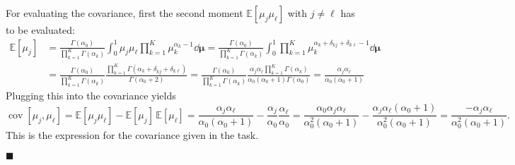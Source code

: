 \documentclass[11pt, a4paper]{scrartcl}
\newcommand{\E}{\mathbb{E}}
\DeclareMathOperator{\cov}{cov}
\renewcommand{\vec}[1]{\bm{#1}}
\newcommand{\eot}{\hfill\(\blacksquare\)}
\begin{document}
			For evaluating the covariance, first the second moment \( \E[\mu_j \mu_\ell] \) with \( j \neq \ell \) has to be evaluated:
			\begin{align}
				\E[\mu_j]
					&= \frac{\Gamma(\alpha_0)}{\prod_{k = 1}^{K} \Gamma(\alpha_k)} \int_{0}^{1}\! \mu_j \mu_\ell \prod_{k = 1}^{K} \mu_k^{\alpha_k - 1} \dd{\vec{\mu}}
					 = \frac{\Gamma(\alpha_0)}{\prod_{k = 1}^{K} \Gamma(\alpha_k)} \int_{0}^{1}\! \prod_{k = 1}^{K} \mu_k^{\alpha_k + \delta_{kj} + \delta_{k\ell} - 1} \dd{\vec{\mu}} \\
					&= \frac{\Gamma(\alpha_0)}{\prod_{k = 1}^{K} \Gamma(\alpha_k)} \frac{\prod_{k = 1}^{K} \Gamma(\alpha_k + \delta_{kj} + \delta_{k\ell})}{\Gamma(\alpha_0 + 2)}
					 = \frac{\Gamma(\alpha_0)}{\prod_{k = 1}^{K} \Gamma(\alpha_k)} \frac{\alpha_j \alpha_\ell \prod_{k = 1}^{K} \Gamma(\alpha_k)}{\alpha_0 (\alpha_0 + 1) \Gamma(\alpha_0)}
					 = \frac{\alpha_j \alpha_\ell}{\alpha_0 (\alpha_0 + 1)}
			\end{align}
			Plugging this into the covariance yields
			\begin{equation}
				\cov[\mu_j, \mu_\ell]
					= \E[\mu_j \mu_\ell] - \E[\mu_j] \, \E[\mu_\ell]
					= \frac{\alpha_j \alpha_\ell}{\alpha_0 (\alpha_0 + 1)} - \frac{\alpha_j}{\alpha_0} \frac{\alpha_\ell}{\alpha_0}
					= \frac{\alpha_0 \alpha_j \alpha_\ell}{\alpha_0^2 (\alpha_0 + 1)} - \frac{\alpha_j \alpha_\ell (\alpha_0 + 1)}{\alpha_0^2 (\alpha_0 + 1)}
					= \frac{-\alpha_j \alpha_\ell}{\alpha_0^2 (\alpha_0 + 1)}.
			\end{equation}
			This is the expression for the covariance given in the task.

			\eot
\end{document}
